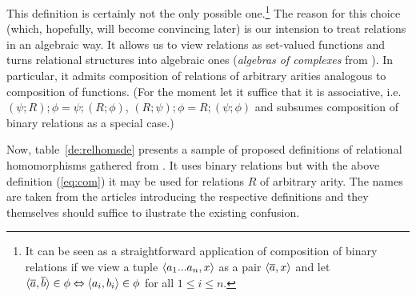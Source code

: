 \documentclass[10pt]{article}
\begin{document}
%
This definition is certainly not the only possible one.\footnote{It
can be seen as a straightforward application of composition of binary
relations if we view a tuple $\langle a_1...a_n,x\rangle$ as a pair $\langle\overline {a},x\rangle$ and let $\langle\overline {a},\overline {b}\rangle\in\phi \Leftrightarrow \langle a_i,b_i\rangle\in\phi$ for
all $1\leq i\leq n$.}  The reason for this choice (which, hopefully,
will become convincing later) is our intension to treat relations in
an algebraic way. 
It allows us to view relations as set-valued functions and turns
relational structures into algebraic ones
({\em algebras of complexes} from \cite{JT1,JT2}). In particular, it admits
composition of relations of arbitrary
arities analogous to composition of functions. (For the moment let
it suffice that it is associative, i.e.\
$(\psi;R);\phi=\psi;(R;\phi)$, $(R;\psi);\phi=R;(\psi;\phi)$ and
subsumes composition of binary relations as a special case.)

Now, table~\ref{de:relhomsde} presents
a sample of proposed definitions of relational homomorphisms gathered from 
\cite{Most,Gratzer,Cohn,Los:relhoms,Pattison,relhoms,c:93,c:94}. It uses binary
relations but with the above definition (\ref{eq:com}) it may be used for relations
$R$ of arbitrary arity.
The names are taken from the articles introducing the respective
definitions and they themselves should suffice to ilustrate the
existing confusion.  \vspace*{-3ex}
\end{document}
